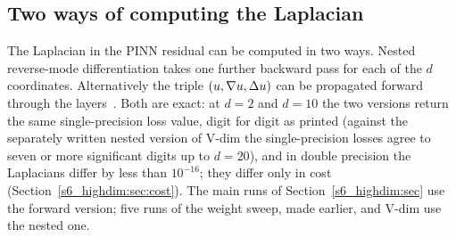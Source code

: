 \subsection{Two ways of computing the Laplacian}\label{S2:sec:lap}

The Laplacian in the PINN residual can be computed in two ways. Nested reverse-mode
differentiation takes one further backward pass for each of the $d$ coordinates.
Alternatively the triple $(u,\nabla u,\Delta u)$ can be propagated forward
through the layers~\citep{li2024forward}. Both are exact: at $d=2$ and $d=10$ the two
versions return the same single-precision loss value, digit for digit as printed (against
the separately written nested version of \textsf{V-dim} the single-precision losses agree
to seven or more significant digits up to $d=20$), and in double precision the Laplacians
differ by less than $10^{-16}$; they differ only in cost (Section~\ref{s6_highdim:sec:cost}).
The main runs of Section~\ref{s6_highdim:sec} use the forward version; five runs of the
weight sweep, made earlier, and \textsf{V-dim} use the nested one.
